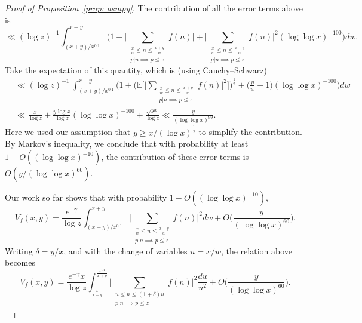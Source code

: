 \documentclass[12pt, notitlepage]{amsart}
\numberwithin{equation}{section}
\def\E{\mathbb E}
\theoremstyle{remark}
\theoremstyle{definition}
\theoremstyle{remark}
\numberwithin{equation}{section}
\begin{document}
\begin{proof}[Proof of Proposition~\ref{prop: asmpy}]
The contribution of all the error terms above is 
$$ 
\ll (\log z)^{-1} \int_{(x+y)/x^{0.1}}^{x+y} \Big( 1+ \Big| \sum_{\substack{ \frac{x}{w} 
\le n \le \frac{x+y}{w} \\ p|n \implies p\le z  }  } f(n) \Big| + \Big| \sum_{\substack{ \frac{x}{w} 
\le n \le \frac{x+y}{w} \\ p|n \implies p\le z  }  } f(n) \Big|^2 (\log \log x)^{-100} \Big) dw. 
$$ 
Take the expectation of this quantity, which is (using Cauchy--Schwarz) 
\begin{align*} 
&\ll (\log z)^{-1} \ \int_{(x+y)/x^{0.1}}^{x+y} \Big( 1 + \Big(\E\Big[  \Big| \sum_{\substack{ \frac{x}{w} 
\le n \le \frac{x+y}{w} \\ p|n \implies p\le z  }  } f(n) \Big|^2 \Big]\Big)^{\frac 12} + \Big( \frac{y}{w} +1\Big) (\log \log x)^{-100} \Big) dw 
\\ 
&\ll \frac{x}{\log z} + \frac{y \log x}{\log z} (\log \log x)^{-100} + \frac{\sqrt{yx}}{\log z} \ll \frac{y}{(\log \log x)^{99}}.
\end{align*} 
Here we used our assumption that $y\ge x/(\log x)^{\frac 12}$ to simplify the contribution.  By Markov's inequality, we conclude that with probability at least $1-O((\log \log x)^{-10})$, 
the contribution of these error terms is $O({y}/{(\log \log x)^{60}})$.
 

Our work so far shows that with probability $1- O((\log \log x)^{-10})$, 
\begin{equation*}
    V_f(x, y) =  \frac{e^{-\gamma}}{\log z} \int_{(x+y)/{x^{0.1}}}^{x+y}  \Big| \sum_{\substack{ \frac{x}{w} 
\le n \le \frac{x+y}{w} \\ p|n \implies p\le z  }  } f(n) \Big|^{2} dw  + O\Big( \frac{y}{(\log \log x)^{60}} \Big).
\end{equation*}
Writing $\delta =y/x$, and with the change of variables $u=x/w$, the relation above becomes 
\begin{equation}\label{eqn: 28}
   V_f(x, y) =  \frac{e^{-\gamma} x}{\log z} \int_{\frac{x}{x+y}}^{\frac{x^{1.1}}{x+y}}  \Big| \sum_{\substack{ u
\le n \le (1+\delta)u \\ p|n \implies p\le z  }  } f(n) \Big|^{2} \frac{du}{u^{2}} + O\Big( \frac{y}{(\log \log x)^{60}} \Big).
\end{equation}



\end{proof}
\end{document}
